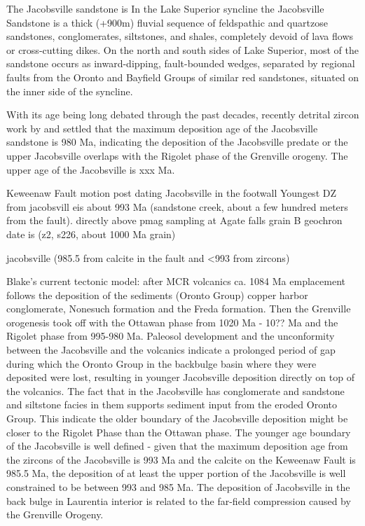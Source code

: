\documentclass[draft]{agujournal2019}
\begin{document}
The Jacobsville sandstone is 
\cite{Kalliokoski1982a} In the Lake Superior syncline the Jacobsville Sandstone is a thick (+900m) fluvial sequence of feldspathic and quartzose sandstones, conglomerates, siltstones, and shales, completely devoid of lava flows or cross-cutting dikes. On the north and south sides of Lake Superior, most of the sandstone occurs as inward-dipping, fault-bounded wedges, separated by regional faults from the Oronto and Bayfield Groups of similar red sandstones, situated on the inner side of the syncline. 

With its age being long debated through the past decades, recently detrital zircon work by \cite{Malone2016a} and  settled that the maximum deposition age of the Jacobsville sandstone  is 980 Ma, indicating the deposition of the Jacobsville predate or the upper Jacobsville overlaps with the Rigolet phase of the Grenville orogeny. The upper age of the Jacobsville is xxx Ma.


Keweenaw Fault motion post dating Jacobsville in the footwall
Youngest DZ from jacobsvill eis about 993 Ma (sandstone creek, about a few hundred meters from the fault). 
directly above pmag sampling at Agate falls grain B geochron date is (z2, s226, about 1000 Ma grain)

jacobsville (985.5 from calcite in the fault and <993 from zircons) 

Blake's current tectonic model: after MCR volcanics ca. 1084 Ma emplacement follows the deposition of the sediments (Oronto Group) copper harbor conglomerate, Nonesuch formation and the Freda formation. Then the Grenville orogenesis took off with the Ottawan phase from 1020 Ma - 10?? Ma and the Rigolet phase from 995-980 Ma. Paleosol development and the unconformity between the Jacobsville and the volcanics indicate a prolonged period of gap during which the Oronto Group in the backbulge basin where they were deposited were lost, resulting in younger Jacobsville deposition directly on top of the volcanics. The fact that in the Jacobsville has conglomerate and sandstone and siltstone facies in them supports sediment input from the eroded Oronto Group. This indicate the older boundary of the Jacobsville deposition might be closer to the Rigolet Phase than the Ottawan phase. The younger age boundary of the Jacobsville is well defined - given that the maximum deposition age from the zircons of the Jacobsville is 993 Ma and the calcite on the Keweenaw Fault is 985.5 Ma, the deposition of at least the upper portion of the Jacobsville is well constrained to be between 993 and 985 Ma. The deposition of Jacobsville in the back bulge in Laurentia interior is related to the far-field compression caused by the Grenville Orogeny. 
\end{document}
